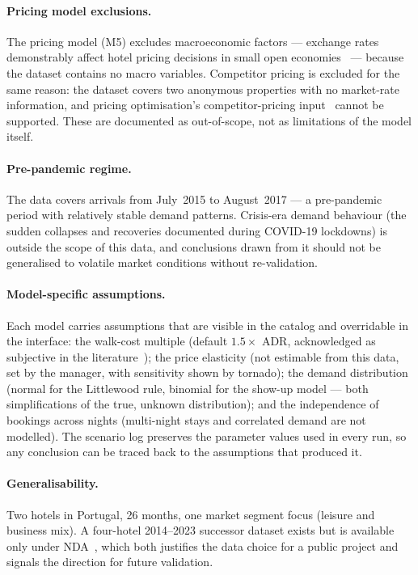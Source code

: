 \paragraph{Pricing model exclusions.}
The pricing model (M5) excludes macroeconomic factors --- exchange rates demonstrably affect hotel pricing decisions in small open economies~\cite{yeoman2024} --- because the dataset contains no macro variables. Competitor pricing is excluded for the same reason: the dataset covers two anonymous properties with no market-rate information, and pricing optimisation's competitor-pricing input~\cite{amadeus2023} cannot be supported. These are documented as out-of-scope, not as limitations of the model itself.

\paragraph{Pre-pandemic regime.}
The data covers arrivals from July~2015 to August~2017 --- a pre-pandemic period with relatively stable demand patterns. Crisis-era demand behaviour (the sudden collapses and recoveries documented during COVID-19 lockdowns) is outside the scope of this data, and conclusions drawn from it should not be generalised to volatile market conditions without re-validation.

\paragraph{Model-specific assumptions.}
Each model carries assumptions that are visible in the catalog and overridable in the interface: the walk-cost multiple (default $1.5 \times$ ADR, acknowledged as subjective in the literature~\cite{pimentel2019}); the price elasticity (not estimable from this data, set by the manager, with sensitivity shown by tornado); the demand distribution (normal for the Littlewood rule, binomial for the show-up model --- both simplifications of the true, unknown distribution); and the independence of bookings across nights (multi-night stays and correlated demand are not modelled). The scenario log preserves the parameter values used in every run, so any conclusion can be traced back to the assumptions that produced it.

\paragraph{Generalisability.}
Two hotels in Portugal, 26 months, one market segment focus (leisure and business mix). A four-hotel 2014--2023 successor dataset exists but is available only under NDA~\cite{silvestre2025}, which both justifies the data choice for a public project and signals the direction for future validation.
